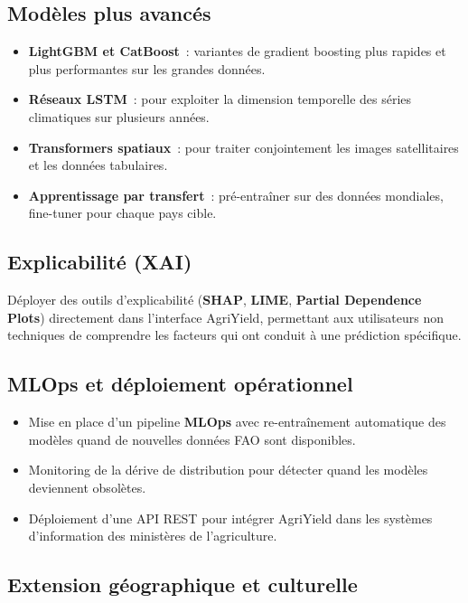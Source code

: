 \subsection{Modèles plus avancés}

\begin{itemize}[leftmargin=1.5cm, itemsep=3pt]
  \item \textbf{LightGBM et CatBoost}~: variantes de gradient boosting plus rapides et plus performantes sur les grandes données.
  \item \textbf{Réseaux LSTM}~: pour exploiter la dimension temporelle des séries climatiques sur plusieurs années.
  \item \textbf{Transformers spatiaux}~: pour traiter conjointement les images satellitaires et les données tabulaires.
  \item \textbf{Apprentissage par transfert}~: pré-entraîner sur des données mondiales, fine-tuner pour chaque pays cible.
\end{itemize}

\subsection{Explicabilité (XAI)}

Déployer des outils d'explicabilité (\textbf{SHAP}, \textbf{LIME}, \textbf{Partial Dependence Plots}) directement dans l'interface AgriYield, permettant aux utilisateurs non techniques de comprendre les facteurs qui ont conduit à une prédiction spécifique.

\subsection{MLOps et déploiement opérationnel}

\begin{itemize}[leftmargin=1.5cm, itemsep=3pt]
  \item Mise en place d'un pipeline \textbf{MLOps} avec re-entraînement automatique des modèles quand de nouvelles données FAO sont disponibles.
  \item Monitoring de la dérive de distribution pour détecter quand les modèles deviennent obsolètes.
  \item Déploiement d'une API REST pour intégrer AgriYield dans les systèmes d'information des ministères de l'agriculture.
\end{itemize}

\subsection{Extension géographique et culturelle}

